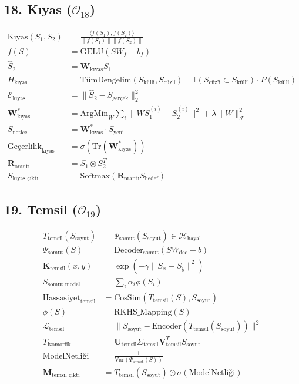 \documentclass[11pt, a4paper]{article}
\begin{document}
\subsection{18. Kıyas ($\mathcal{O}_{18}$)}
\begin{align}
\text{Kıyas}(S_1, S_2) &= \frac{\langle f(S_1), f(S_2) \rangle}{\|f(S_1)\| \|f(S_2)\|} \\
f(S) &= \text{GELU}(S W_f + b_f) \\
\hat{S}_2 &= \mathbf{W}_{\text{kıyas}} S_1 \\
H_{\text{kıyas}} &= \text{TümDengelim}(S_{\text{küllî}}, S_{\text{cüz'î}}) = \mathbb{I}(S_{\text{cüz'î}} \subset S_{\text{küllî}}) \cdot P(S_{\text{küllî}}) \\
\mathcal{E}_{\text{kıyas}} &= \| \hat{S}_2 - S_{\text{gerçek}} \|_2^2 \\
\mathbf{W}_{\text{kıyas}}^* &= \text{ArgMin}_W \sum_i \| W S_1^{(i)} - S_2^{(i)} \|^2 + \lambda \|W\|_{\mathcal{F}}^2 \\
S_{\text{netice}} &= \mathbf{W}_{\text{kıyas}}^* \cdot S_{\text{yeni}} \\
\text{Geçerlilik}_{\text{kıyas}} &= \sigma(\text{Tr}(\mathbf{W}_{\text{kıyas}}^*)) \\
\mathbf{R}_{\text{orantı}} &= S_1 \otimes S_2^T \\
S_{\text{kıyas\_çıktı}} &= \text{Softmax}(\mathbf{R}_{\text{orantı}} S_{\text{hedef}})
\end{align}

\subsection{19. Temsil ($\mathcal{O}_{19}$)}
\begin{align}
T_{\text{temsil}}(S_{\text{soyut}}) &= \Psi_{\text{somut}}(S_{\text{soyut}}) \in \mathcal{H}_{\text{hayal}} \\
\Psi_{\text{somut}}(S) &= \text{Decoder}_{\text{somut}}(S W_{\text{dec}} + b) \\
\mathbf{K}_{\text{temsil}}(x, y) &= \exp\left( -\gamma \|S_x - S_y\|^2 \right) \\
S_{\text{somut\_model}} &= \sum_i \alpha_i \phi(S_i) \\
\text{Hassasiyet}_{\text{temsil}} &= \text{CosSim}\left(T_{\text{temsil}}(S), S_{\text{soyut}}\right) \\
\phi(S) &= \text{RKHS\_Mapping}(S) \\
\mathcal{L}_{\text{temsil}} &= \| S_{\text{soyut}} - \text{Encoder}(T_{\text{temsil}}(S_{\text{soyut}})) \|^2 \\
T_{\text{izomorfik}} &= \mathbf{U}_{\text{temsil}} \Sigma_{\text{temsil}} \mathbf{V}_{\text{temsil}}^T S_{\text{soyut}} \\
\text{ModelNetliği} &= \frac{1}{\text{Var}(\Psi_{\text{somut}}(S))} \\
\mathbf{M}_{\text{temsil\_çıktı}} &= T_{\text{temsil}}(S_{\text{soyut}}) \odot \sigma(\text{ModelNetliği})
\end{align}
\end{document}
